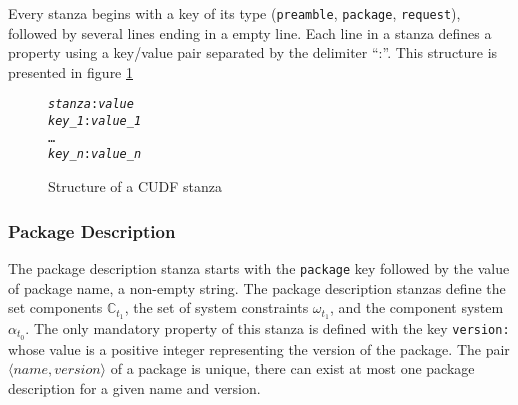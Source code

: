 Every stanza begins with a key of its type (\verb+preamble+, \verb+package+, \verb+request+), followed by several lines ending in a empty line.
Each line in a stanza defines a property using a key/value pair separated by the delimiter ``:''.
This structure is presented in figure \ref{formal.cudfstanza}

\begin{figure}[htp] 
\begin{center}
\begin{alltt}
\textit{stanza}: \textit{value}
\textit{key_1}: \textit{value_1}
\ldots
\textit{key_n}: \textit{value_n}
\end{alltt}
  \caption{Structure of a CUDF stanza}
  \label{formal.cudfstanza}
\end{center}
\end{figure}

\subsubsection{Package Description}
The package description stanza starts with the \verb+package+ key followed by the value of package name, a non-empty string.
The package description stanzas define the set components $\mathbb{C}_{t_1}$, the set of system constraints $\omega_{t_1}$, and the component system $\alpha_{t_{0}}$.
The only mandatory property of this stanza is defined with the key \verb+version:+ whose value is a positive integer representing the version of the package.
The pair $\langle name, version \rangle$ of a package is unique, there can exist at most one package description for a given name and version.

